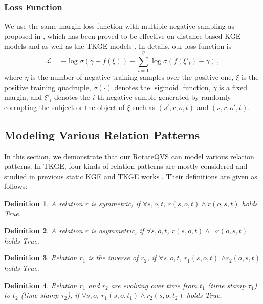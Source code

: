 \documentclass[11pt]{article}
\newtheorem{myDef}{Definition}
\begin{document}
\subsubsection{Loss Function}
We use the same margin loss function with multiple negative sampling as proposed in \cite{SunDNT19}, which has been proved to be effective on distance-based KGE models \cite{bordes2013translating,SunDNT19} and as well as the TKGE models \cite{xu2019temporal,xu2020tero}.
In details, our loss function is
\begin{equation}
    \mathcal{L} = - \log\sigma (\gamma - f(\xi)) - \sum_{i=1}^{\eta}\log\sigma(f({\xi}'_i) - \gamma) \, ,
\end{equation}
where $\eta$ is the number of negative training samples over the positive one, $\xi$ is the positive training quadruple, $\sigma(\cdot)$ denotes the $\operatorname{sigmoid}$ function, $\gamma$ is a fixed margin, and $\xi'_i$ denotes the $i$-th negative sample generated by randomly corrupting the subject or the object of $\xi$ such as $(s', r, o, t)$ and $(s, r, o', t)$.



\subsection{Modeling Various Relation Patterns}

In this section, we demonstrate that our RotateQVS can model various relation patterns.
In TKGE, four kinds of relation patterns are mostly considered and studied in previous static KGE and TKGE works \cite{SunDNT19,gao2020rotate3d}.
Their definitions are given as follows:
\begin{myDef}
	\label{definition:r1}
    A relation $r$ is symmetric, if $ \forall s,o,t$, $ r(s,o,t) \land r(o,s,t)$  holds True.
\end{myDef}

\begin{myDef}
	\label{definition:r2}
    A relation $r$ is asymmetric, if $ \forall s,o,t$, $ r(s,o,t) \land \lnot r(o,s,t)$  holds True.
\end{myDef}

\begin{myDef}
	\label{definition:r3}
    Relation $r_1$ is the inverse of $r_2$, if $ \forall s,o,t$, $ r_1(s,o,t)$ $\land$$ r_2(o,s,t)$  holds True.
\end{myDef}

\begin{myDef}
	\label{definition:r4}
    Relation $r_1$ and $r_2$ are evolving over time from $t_1$ (time stamp $\tau_1$) to $t_2$ (time stamp $\tau_2$), if $ \forall s,o$, $ r_1(s,o,t_1) \land r_2(s,o,t_2)$  holds True.
\end{myDef}
\end{document}
